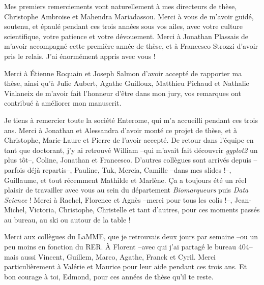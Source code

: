 \documentclass[12pt,a4paper]{reedthesis}
\theoremstyle{definition}
\theoremstyle{definition}
\theoremstyle{definition}
\theoremstyle{remark}
\begin{document}
  \begin{acknowledgements}
    Mes premiers remerciements vont naturellement à mes directeurs de thèse, Christophe Ambroise et Mahendra Mariadassou. Merci à vous de m'avoir guidé, soutenu, et épaulé pendant ces trois années sous vos ailes, avec votre culture scientifique, votre patience et votre dévouement. Merci à Jonathan Plassais de m'avoir accompagné cette première année de thèse, et à Francesco Strozzi d'avoir pris le relais. J'ai énormément appris avec vous !
    
    \vspace{5mm}
    
    Merci à Étienne Roquain et Joseph Salmon d'avoir accepté de rapporter ma thèse, ainsi qu'à Julie Aubert, Agathe Guilloux, Matthieu Pichaud et Nathalie Vialaneix de m'avoir fait l'honneur d'être dans mon jury, vos remarques ont contribué à améliorer mon manuscrit.
    
    \vspace{5mm}
    
    Je tiens à remercier toute la société Enterome, qui m'a accueilli pendant ces trois ans. Merci à Jonathan et Alessandra d'avoir monté ce projet de thèse, et à Christophe, Marie-Laure et Pierre de l'avoir accepté. De retour dans l'équipe en tant que doctorant, j'y ai retrouvé William --qui m'avait fait découvrir \emph{ggplot2} un plus tôt--, Coline, Jonathan et Francesco. D'autres collègues sont arrivés depuis --parfois déjà repartis--, Pauline, Tuk, Mercia, Camille --dans mes slides !--, Guillaume, et tout récemment Mathilde et Marlène. Ça a toujours été un réel plaisir de travailler avec vous au sein du département \emph{Biomarqueurs} puis \emph{Data Science} ! Merci à Rachel, Florence et Agnès --merci pour tous les colis !--, Jean-Michel, Victoria, Christophe, Christelle et tant d'autres, pour ces moments passés au bureau, au ski ou autour de la table !
    
    \vspace{5mm}
    
    Merci aux collègues du LaMME, que je retrouvais deux jours par semaine --ou un peu moins en fonction du RER. À Florent --avec qui j'ai partagé le bureau 404-- mais aussi Vincent, Guillem, Marco, Agathe, Franck et Cyril. Merci particulièrement à Valérie et Maurice pour leur aide pendant ces trois ans. Et bon courage à toi, Edmond, pour ces années de thèse qu'il te reste.
    
    \vspace{5mm}
    

\end{acknowledgements}
\end{document}
